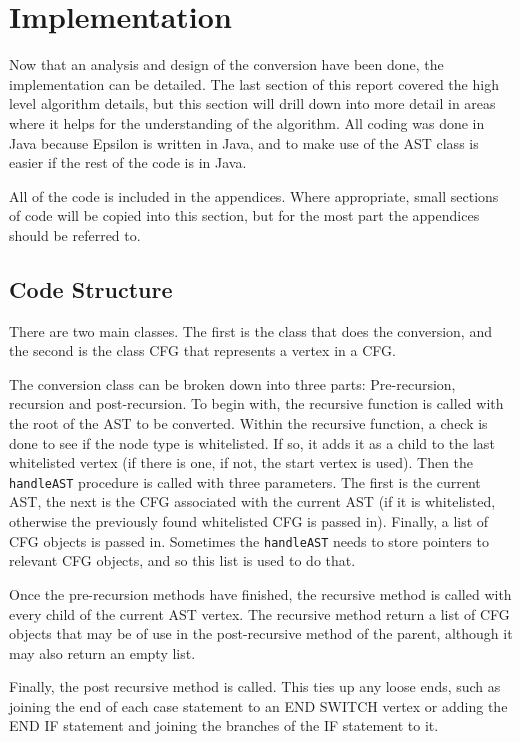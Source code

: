 \section{Implementation}

Now that an analysis and design of the conversion have been done, the implementation can be detailed. The last section of this report covered the high level algorithm details, but this section will drill down into more detail in areas where it helps for the understanding of the algorithm. All coding was done in Java because Epsilon is written in Java, and to make use of the AST class is easier if the rest of the code is in Java.

All of the code is included in the appendices. Where appropriate, small sections of code will be copied into this section, but for the most part the appendices should be referred to.

\subsection{Code Structure}

There are two main classes. The first is the class that does the conversion, and the second is the class CFG that represents a vertex in a CFG.

The conversion class can be broken down into three parts: Pre-recursion, recursion and post-recursion. To begin with, the recursive function is called with the root of the AST to be converted. Within the recursive function, a check is done to see if the node type is whitelisted. If so, it adds it as a child to the last whitelisted vertex (if there is one, if not, the start vertex is used). Then the \verb|handleAST| procedure is called with three parameters. The first is the current AST, the next is the CFG associated with the current AST (if it is whitelisted, otherwise the previously found whitelisted CFG is passed in). Finally, a list of CFG objects is passed in. Sometimes the \verb|handleAST| needs to store pointers to relevant CFG objects, and so this list is used to do that.

Once the pre-recursion methods have finished, the recursive method is called with every child of the current AST vertex. The recursive method return a list of CFG objects that may be of use in the post-recursive method of the parent, although it may also return an empty list. 

Finally, the post recursive method is called. This ties up any loose ends, such as joining the end of each case statement to an END SWITCH vertex or adding the END IF statement and joining the branches of the IF statement to it.

